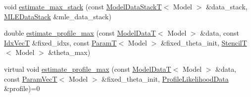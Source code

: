 \begin{DoxyCompactItemize}
\item 
void \hyperlink{classmappel_1_1estimator_1_1Estimator_aba9d96880ade861e4086b5c2cbde46b1}{estimate\+\_\+max\+\_\+stack} (const \hyperlink{namespacemappel_aaeb6665bc57476dd93c2df6ad8bc4768}{Model\+Data\+StackT}$<$ Model $>$ \&data\+\_\+stack, \hyperlink{namespacemappel_1_1estimator_structmappel_1_1estimator_1_1MLEDataStack}{M\+L\+E\+Data\+Stack} \&mle\+\_\+data\+\_\+stack)
\end{DoxyCompactItemize}

{\bf }\par
\begin{DoxyCompactItemize}
\item 
double \hyperlink{classmappel_1_1estimator_1_1Estimator_aaadd90fa484e5becd980d2c3e268c97b}{estimate\+\_\+profile\+\_\+max} (const \hyperlink{namespacemappel_a97f050df953605381ae9c901c3b125f1}{Model\+DataT}$<$ Model $>$ \&data, const \hyperlink{namespacemappel_ac63743dcd42180127307cd0e4ecdd784}{Idx\+VecT} \&fixed\+\_\+idxs, const \hyperlink{namespacemappel_a667925cb0d6c0e49f2f035cc5a9a6857}{ParamT}$<$ Model $>$ \&fixed\+\_\+theta\+\_\+init, \hyperlink{namespacemappel_a3a06598240007876f8c4bf834ad86197}{StencilT}$<$ Model $>$ \&theta\+\_\+max)
\item 
virtual void \hyperlink{classmappel_1_1estimator_1_1Estimator_aebcf83a1264fa41f6608a77fa239a60c}{estimate\+\_\+profile\+\_\+max} (const \hyperlink{namespacemappel_a97f050df953605381ae9c901c3b125f1}{Model\+DataT}$<$ Model $>$ \&data, const \hyperlink{namespacemappel_a0f86d3153e4e27b095012f140eea58de}{Param\+VecT}$<$ Model $>$ \&fixed\+\_\+theta\+\_\+init, \hyperlink{namespacemappel_1_1estimator_structmappel_1_1estimator_1_1ProfileLikelihoodData}{Profile\+Likelihood\+Data} \&profile)=0
\end{DoxyCompactItemize}

